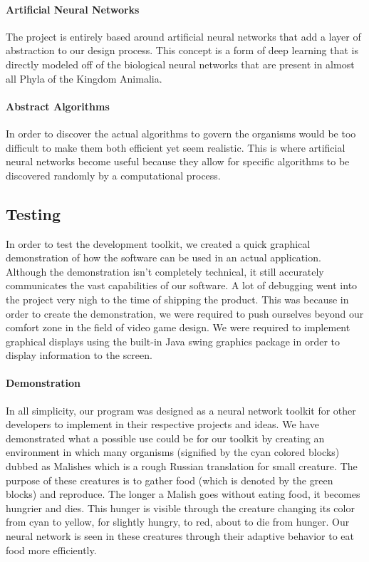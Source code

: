 \documentclass[letterpaper, 10pt]{article}
\begin{document}
		\paragraph{Artificial Neural Networks}
		The project is entirely based around artificial neural networks that add a layer of abstraction to our design process. This concept is a form of deep learning that is directly modeled off of the biological neural networks that are present in almost all Phyla of the Kingdom Animalia.
		\paragraph{Abstract Algorithms}
		In order to discover the actual algorithms to govern the organisms would be too difficult to make them both efficient yet seem realistic. This is where artificial neural networks become useful because they allow for specific algorithms to be discovered randomly by a computational process.
	\subsection{Testing}
		In order to test the development toolkit, we created a quick graphical demonstration of how the software can be used in an actual application. Although the demonstration isn't completely technical, it still accurately communicates the vast capabilities of our software. A lot of debugging went into the project very nigh to the time of shipping the product. This was because in order to create the demonstration, we were required to push ourselves beyond our comfort zone in the field of video game design. We were required to implement graphical displays using the built-in Java swing graphics package in order to display information to the screen.
		\paragraph{Demonstration} In all simplicity, our program was designed as a neural network toolkit for other developers to implement in their respective projects and ideas. We have demonstrated what a possible use could be for our toolkit by creating an environment in which many organisms (signified by the cyan colored blocks) dubbed as Malishes which is a rough Russian translation for small creature. The purpose of these creatures is to gather food (which is denoted by the green blocks) and reproduce. The longer a Malish goes without eating food, it becomes hungrier and dies. This hunger is visible through the creature changing its color from cyan to yellow, for slightly hungry, to red, about to die from hunger. Our neural network is seen in these creatures through their adaptive behavior to eat food more efficiently.  
\end{document}
